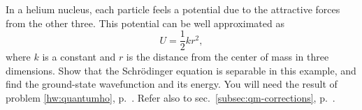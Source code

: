 In a helium nucleus, each particle feels a potential due to the attractive
forces from the other three. This potential can be well approximated as
\begin{equation*}
  U = \frac{1}{2}kr^2,
\end{equation*}
where $k$ is a constant and $r$ is the distance from the center of mass in three dimensions.
Show that the Schr\"odinger equation is separable in this example, and
find the ground-state wavefunction and its energy. You will need the result of problem
\ref{hw:quantumho}, p.~\pageref{hw:quantumho}. Refer also to sec.~\ref{subsec:qm-corrections},
p.~\pageref{subsec:qm-corrections}.

